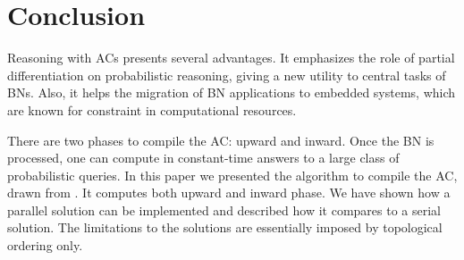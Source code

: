 \documentclass[twoside,11pt]{article}
\begin{document}
\section{Conclusion}
\label{sec:conc}

Reasoning with ACs presents several advantages.
It emphasizes the role of partial differentiation on probabilistic reasoning, giving a new utility to central tasks of BNs.
Also, it helps the migration of BN applications to embedded systems, which are known for constraint in computational resources.


There are two phases to compile the AC: upward and inward.
Once the BN is processed, one can compute in constant-time answers to a large class of probabilistic queries.
In this paper we presented the algorithm to compile the AC, drawn from \cite{darwiche2009modeling}.
It computes both upward and inward phase.
We have shown how a parallel solution can be implemented and described how it compares to a serial solution.
The limitations to the solutions are essentially imposed by  topological ordering only.


\vskip 0.2in

\end{document}
